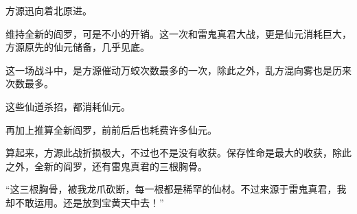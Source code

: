 \begin{this_body}
方源迅向着北原进。

维持全新的阎罗，可是不小的开销。这一次和雷鬼真君大战，更是仙元消耗巨大，方源原先的仙元储备，几乎见底。

这一场战斗中，是方源催动万蛟次数最多的一次，除此之外，乱方混向雾也是历来次数最多。

这些仙道杀招，都消耗仙元。

再加上推算全新阎罗，前前后后也耗费许多仙元。

算起来，方源此战折损极大，不过也不是没有收获。保存性命是最大的收获，除此之外，全新的阎罗，还有雷鬼真君的三根胸骨。

“这三根胸骨，被我龙爪砍断，每一根都是稀罕的仙材。不过来源于雷鬼真君，我却不敢运用。还是放到宝黄天中去！”

\end{this_body}

